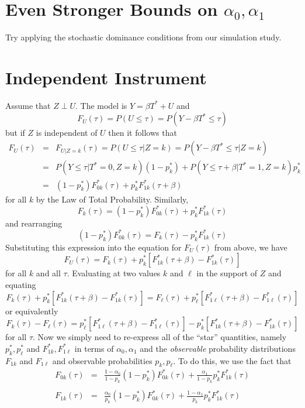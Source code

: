 \documentclass[12pt]{article}
\begin{document}
\section{Even Stronger Bounds on $\alpha_0, \alpha_1$}
Try applying the stochastic dominance conditions from our simulation study.

\section{Independent Instrument}
Assume that $Z \perp U$.  
The model is $Y = \beta T^* + U$ and
\[ F_{U}(\tau) = P(U \leq\tau) = P(Y - \beta T^* \leq \tau)\]
but if $Z$ is independent of $U$ then it follows that
\begin{eqnarray*}
F_U(\tau) &=&  F_{U|Z=k}(\tau) = P(U\leq \tau |Z=k) = P(Y  - \beta T^* \leq \tau |Z=k)\\
&=&  P(Y \leq \tau |T^* = 0, Z = k)(1 - p_k^*) + P(Y\leq \tau + \beta| T^* = 1, Z = k)p_k^* \\
&=& (1 - p_k^*) F^*_{0k}(\tau) + p_k^* F^*_{1k}(\tau + \beta)
\end{eqnarray*} 
for all $k$ by the Law of Total Probability.
Similarly, 
\[ F_k(\tau) = (1 - p_k^*) F_{0k}^*(\tau)  + p_k^* F_{1k}^*(\tau)\]
and rearranging
\[  (1 - p_k^*) F_{0k}^*(\tau)  = F_k(\tau) - p_k^* F_{1k}^*(\tau)\]
Substituting this expression into the equation for $F_U(\tau)$ from above, we have
\[F_U(\tau) = F_k(\tau) + p_k^* \left[ F_{1k}^*(\tau+ \beta) - F_{1k}^*(\tau)\right]\]
for all $k$ and all $\tau$.
Evaluating at two values $k$ and $\ell$ in the support of $Z$ and equating 
\[ F_k(\tau) + p_k^* \left[ F_{1k}^*(\tau+ \beta) - F_{1k}^*(\tau)\right] =  F_\ell(\tau) + p_\ell^* \left[ F_{1\ell}^*(\tau+ \beta) - F_{1\ell}^*(\tau)\right]\]
or equivalently
\begin{equation}
 F_k(\tau) - F_\ell(\tau) =  p_\ell^* \left[ F_{1\ell}^*(\tau+ \beta) - F_{1\ell}^*(\tau)\right] - p_k^* \left[ F_{1k}^*(\tau+ \beta) - F_{1k}^*(\tau)\right]  
 \label{eq:CDFs1}
\end{equation}
for all $\tau$.
Now we simply need to re-express all of the ``star'' quantities, namely $p_k^*, p_\ell^*$ and $F_{1k}^*, F_{1\ell}^*$ in terms of $\alpha_0, \alpha_1$ and the \emph{observable} probability distributions $F_{1k}$ and $F_{1\ell}$ and observable probabilities $p_k, p_\ell$.
To do this, we use the fact that
\begin{eqnarray*}
  F_{0k}(\tau) &=& \frac{1 - \alpha_0}{1 - p_k} (1 - p^*_k)F_{0k}^*(\tau) + \frac{\alpha_1}{1 - p_k}p_k^* F_{1k}^*(\tau)\\ \\
  F_{1k}(\tau) &=& \frac{ \alpha_0}{p_k}(1 - p_k^*) F_{0k}^*(\tau) + \frac{1 - \alpha_1}{p_k}p_k^* F_{1k}^*(\tau)
\end{eqnarray*}
\end{document}
